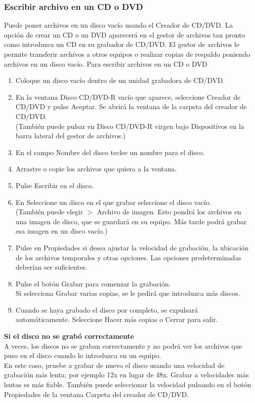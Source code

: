 \subsubsection{Escribir archivo en un CD o DVD}
Puede poner archivos en un disco vacío usando el Creador de CD/DVD. La opción de crear un CD o un DVD aparecerá en el gestor de archivos tan pronto como introduzca un CD en su grabador de CD/DVD. El gestor de archivos le permite transferir archivos a otros equipos o realizar copias de respaldo poniendo archivos en un disco vacío. Para escribir archivos en un CD o DVD
\begin{enumerate}
\item Coloque un disco vacío dentro de un unidad grabadora de CD/DVD.
\item En la ventana Disco CD/DVD-R vacío que aparece, seleccione Creador de CD/DVD y pulse Aceptar. Se abrirá la ventana de la carpeta del creador de CD/DVD.\\
(También puede pulsar en Disco CD/DVD-R virgen bajo Dispositivos en la barra lateral del gestor de archivos.)
\item En el campo Nombre del disco teclee un nombre para el disco.
\item Arrastre o copie los archivos que quiera a la ventana.
\item Pulse Escribir en el disco.
\item En Seleccione un disco en el que grabar seleccione el disco vacío.\\
(También puede elegir $>$ Archivo de imagen. Esto pondrá los archivos en una imagen de disco, que se guardará en su equipo. Más tarde podrá grabar esa imagen en un disco vacío.)
\item Pulse en Propiedades si desea ajustar la velocidad de grabación, la ubicación de los archivos temporales y otras opciones. Las opciones predeterminadas deberían ser suficientes.
\item Pulse el botón Grabar para comenzar la grabación.\\
Si selecciona Grabar varias copias, se le pedirá que introduzca más discos.
\item Cuando se haya grabado el disco por completo, se expulsará automáticamente. Seleccione Hacer más copias o Cerrar para salir.
\end{enumerate}
{\bf Si el disco no se grabó correctamente}\\
A veces, los discos no se graban correctamente y no podrá ver los archivos que puso en el disco cuando lo introduzca en un equipo.\\
En este caso, pruebe a grabar de nuevo el disco usando una velocidad de grabación más lenta; por ejemplo 12x en lugar de 48x. Grabar a velocidades más lentas es más fiable. También puede seleccionar la velocidad pulsando en el botón Propiedades de la ventana Carpeta del creador de CD/DVD.
